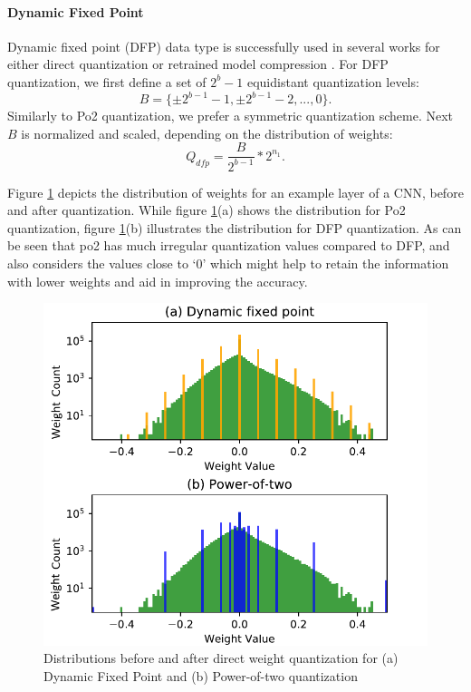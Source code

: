 \paragraph{Dynamic Fixed Point}
Dynamic fixed point (DFP) data type is successfully used in several works for either direct quantization or retrained model compression \cite{Hubara2016, Gysel2016a}.
For DFP quantization, we first define a set of $2^{b}-1$ equidistant quantization levels:
\begin{equation}\label{eq:dfp_nums}
B = \{\pm 2^{b-1}-1,\pm 2^{b-1}-2,... ,0\}.
\end{equation}
Similarly to Po2 quantization, we prefer a symmetric quantization scheme. 
Next $B$ is normalized and scaled, depending on the distribution of weights:
\begin{equation}\label{eq:dfp_quant}
Q_{dfp} = \frac{B}{2^{b-1}}*2^{n_1}.
\end{equation}

Figure \ref{fig:quant_hist} depicts the distribution of weights for an 
example layer of a CNN, before and after quantization. While 
figure \ref{fig:quant_hist}(a) shows the distribution for Po2 quantization, 
figure \ref{fig:quant_hist}(b) illustrates the distribution for DFP quantization. 
As can be seen that po2 has much irregular quantization values compared to DFP, 
and also considers the values close to `0' which might help to retain the 
information with lower weights and aid in improving the accuracy.


\begin{figure}[ht!]
\includegraphics[width=\columnwidth]{img/histograms2.pdf}
\caption{Distributions before and after direct weight quantization for (a) Dynamic Fixed Point and (b) Power-of-two quantization}\label{fig:quant_hist}
\end{figure}

